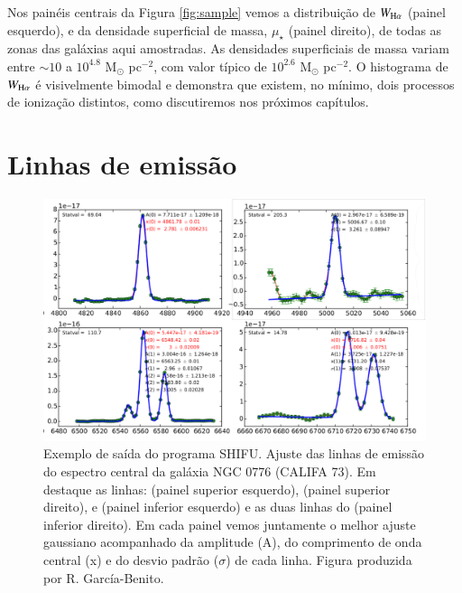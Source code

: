 Nos painéis centrais da Figura \ref{fig:sample} vemos a distribuição de $W_{\Ha}$ (painel esquerdo), e da densidade superficial de massa, $\mu_\star$ (painel direito), de todas as zonas das galáxias aqui amostradas. As densidades superficiais de massa variam entre $\sim 10$ a $10^{4.8}$ M$_\odot$ pc$^{-2}$, com valor típico de $10^{2.6}$ M$_\odot$ pc$^{-2}$. O histograma de $W_{\Ha}$ é visivelmente bimodal e demonstra que existem, no mínimo, dois processos de ionização distintos, como discutiremos nos próximos capítulos.


\section{Linhas de emissão}
\label{sec:sample:eml}
\begin{figure}
	\centering
	\includegraphics[scale=0.6]{figuras/K0073_centralzone_HbO3HaN2S2.pdf}
	\caption[SHIFU: Exemplo de ajuste de linha de emissão]
	{Exemplo de saída do programa SHIFU. Ajuste das linhas de emissão do espectro central da galáxia NGC 0776 (CALIFA 73). Em destaque as linhas: \Hb (painel superior esquerdo), \oiii (painel superior direito), \nii e \Ha (painel inferior esquerdo) e as duas linhas do \sii (painel inferior direito). Em cada painel vemos juntamente o melhor ajuste gaussiano acompanhado da amplitude (A), do comprimento de onda central (x) e do desvio padrão ($\sigma$) de cada linha. Figura produzida por R. García-Benito.}
	\label{fig:rgbline}
\end{figure}

